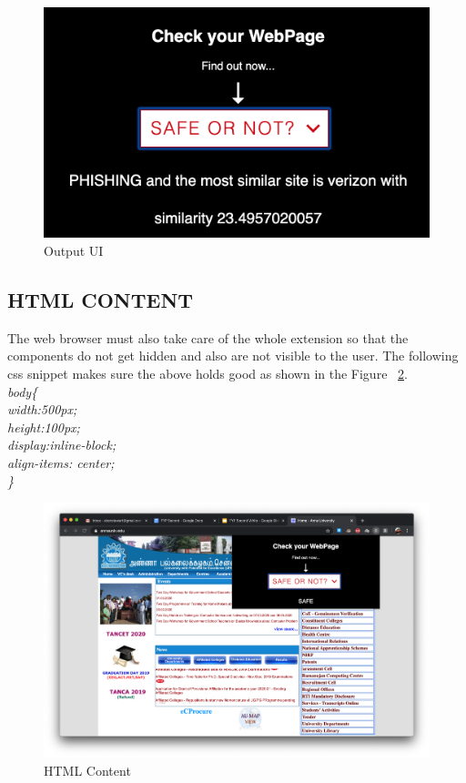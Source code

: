 \begin{figure}[htp]
\centering
\includegraphics[scale=0.5]{Figures/image13.png}
\caption{Output UI}
\label{fig:oui}
\end{figure}

\subsection{HTML CONTENT}
The web browser must also take care of the whole extension so that the components do not get hidden and also are not visible to the user. The following css snippet makes sure the above holds good as shown in the Figure ~\ref{fig:htmlc}.\\
\null\quad\textit{body\{}\\
\null\quad\quad\textit{width:500px;}\\
\null\quad\quad\textit{height:100px;}\\
\null\quad\quad\textit{display:inline-block;}\\
\null\quad\quad\textit{align-items: center;}\\
\null\quad\textit{\}}\\

\begin{figure}[htp]
\centering
\includegraphics[scale=0.2]{Figures/image2.png}
\caption{HTML Content}
\label{fig:htmlc}
\end{figure}


















